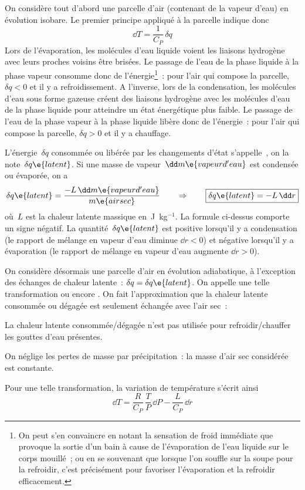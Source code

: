 \sk
On considère tout d'abord une parcelle d'air (contenant de la vapeur d'eau) en évolution isobare. Le premier principe appliqué à la parcelle indique donc
\[ \dd T = \frac{1}{C_P} \, \delta q \]
Lors de l'évaporation, les molécules d'eau liquide voient les liaisons hydrogène avec leurs proches voisins être brisées. Le passage de l'eau de la phase liquide à la phase vapeur consomme donc de l'énergie\footnote{On peut s'en convaincre en notant la sensation de froid immédiate que provoque la sortie d'un bain à cause de l'évaporation de l'eau liquide sur le corps mouillé~; ou en se souvenant que lorsque l'on souffle sur la soupe pour la refroidir, c'est précisément pour favoriser l'évaporation et la refroidir efficacement.}~: pour l'air qui compose la parcelle, $\delta q < 0$ et il y a refroidissement. 
A l'inverse, lors de la condensation, les molécules d'eau sous forme gazeuse créent des liaisons hydrogène avec les molécules d'eau de la phase liquide pour atteindre un état énergétique plus faible. Le passage de l'eau de la phase vapeur à la phase liquide libère donc de l'énergie~: pour l'air qui compose la parcelle, $\delta q > 0$ et il y a chauffage.

\sk
L'énergie~$\delta q$ consommée ou libérée par les changements d'état s'appelle~, on la note~$\delta q\e{latent}$. Si une masse de vapeur~$\dd m\e{vapeur d'eau}$ est condensée ou évaporée, on a
\[ \delta q\e{latent} = \frac{- L \, \dd m\e{vapeur d'eau}}{m\e{air sec}} \qquad \Rightarrow \qquad \boxed{ \delta q\e{latent} = - L \, \dd r } \]
où~$L$ est la chaleur latente massique en~J~kg$^{-1}$. La formule ci-dessus comporte un signe négatif. La quantité~$\delta q\e{latent}$ est positive lorsqu'il y a condensation (le rapport de mélange en vapeur d'eau diminue $\dd r < 0$) et négative lorsqu'il y a évaporation (le rapport de mélange en vapeur d'eau augmente $\dd r > 0$).

\sk
On considère désormais une parcelle d'air en évolution adiabatique, à l'exception des échanges de chaleur latente~: $\delta q = \delta q\e{latent}$. On appelle une telle transformation  ou encore . On fait l'approximation que la chaleur latente consommée ou dégagée est seulement échangée avec l'air sec~:
\begin{citemize}
\item La chaleur latente consommée/dégagée n'est pas utilisée pour refroidir/chauffer les gouttes d'eau présentes.
\item On néglige les pertes de masse par précipitation~: la masse d'air sec considérée est constante.
\end{citemize}
Pour une telle transformation, la variation de température s'écrit ainsi
\[ \dd T = \frac{R}{C_P} \, \frac{T}{P} \, \dd P - \frac{L}{C_P} \, \dd r \]

